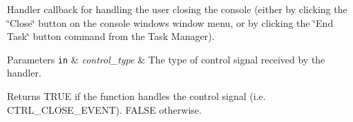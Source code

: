 Handler callback for handling the user closing the console (either by clicking the \char`\"{}\+Close\char`\"{} button on the console window\textquotesingle{}s window menu, or by clicking the \char`\"{}\+End Task\char`\"{} button command from the Task Manager).


\begin{DoxyParams}[1]{Parameters}
\mbox{\tt in}  & {\em control\+\_\+type} & The type of control signal received by the handler. \\
\hline
\end{DoxyParams}
\begin{DoxyReturn}{Returns}
{\ttfamily T\+R\+UE} if the function handles the control signal (i.\+e. {\ttfamily C\+T\+R\+L\+\_\+\+C\+L\+O\+S\+E\+\_\+\+E\+V\+E\+NT}). {\ttfamily F\+A\+L\+SE} otherwise. 
\end{DoxyReturn}

